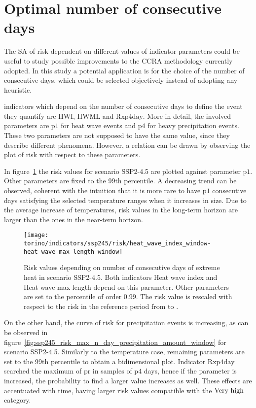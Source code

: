 \section{Optimal number of consecutive days}
The \gls{SA} of risk dependent on different values of indicator parameters could be useful to study possible improvements to the \gls{CCRA} methodology currently adopted. In this study a potential application is for the choice of the number of consecutive days, which could be selected objectively instead of adopting any heuristic.

\Glspl{indicator} which depend on the number of consecutive days to define the event they quantify are $\mathrm{HWI}$, $\mathrm{HWML}$ and $\mathrm{Rxp4day}$. More in detail, the involved parameters are $\mathrm{p1}$ for heat wave events and $\mathrm{p4}$ for heavy precipitation events. These two parameters are not supposed to have the same value, since they describe different phenomena. However, a relation can be drawn by observing the plot of risk with respect to these parameters.

In figure~\ref{fig:ssp245_risk_heat_wave_index_window-heat_wave_max_length_window} the risk values for scenario SSP2-4.5 are plotted against parameter $\mathrm{p1}$. Other parameters are fixed to the 99th percentile. A decreasing trend can be observed, coherent with the intuition that it is more rare to have $\mathrm{p1}$ consecutive days satisfying the selected temperature ranges when it increases in size. Due to the average increase of temperatures, risk values in the long-term horizon are larger than the ones in the near-term horizon.

\begin{figure}
  \centering
  \texttt{[image: torino/indicators/ssp245/risk/heat\_wave\_index\_window-heat\_wave\_max\_length\_window]}
  \caption{Risk values depending on number of consecutive days of extreme heat in scenario SSP2-4.5. Both indicators {Heat wave index} and {Heat wave max length} depend on this parameter. Other parameters are set to the percentile of order 0.99. The risk value is rescaled with respect to the risk in the reference period from  to .}
  \label{fig:ssp245_risk_heat_wave_index_window-heat_wave_max_length_window}
\end{figure}

On the other hand, the curve of risk for precipitation events is increasing, as can be observed in figure~\ref{fig:ssp245_risk_max_n_day_precipitation_amount_window} for scenario SSP2-4.5. Similarly to the temperature case, remaining parameters are set to the 99th percentile to obtain a bidimensional plot. Indicator $\mathrm{Rxp4day}$ searched the maximum of \gls{pr} in samples of $\mathrm{p4}$ days, hence if the parameter is increased, the probability to find a larger value increases as well. These effects are accentuated with time, having larger risk values compatible with the $\text{Very high}$ category.

